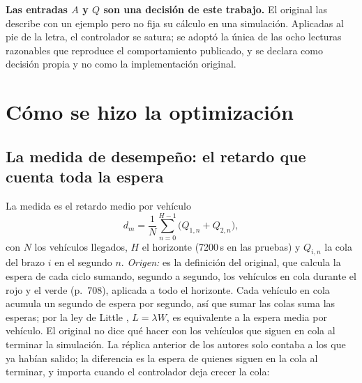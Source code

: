 \documentclass[11pt,a4paper]{article}
\begin{document}
\textbf{Las entradas $A$ y $Q$ son una decisión de este trabajo.} El original las describe con un ejemplo pero no fija su cálculo en una simulación. Aplicadas al pie de la letra, el controlador se satura; se adoptó la única de las ocho lecturas razonables que reproduce el comportamiento publicado, y se declara como decisión propia y no como la implementación original.

\section{Cómo se hizo la optimización}
\label{sec:como}

\subsection{La medida de desempeño: el retardo que cuenta toda la espera}
\label{sec:medida}
La medida es el retardo medio por vehículo
\begin{equation}
d_m=\frac{1}{N}\sum_{n=0}^{H-1}\bigl(Q_{1,n}+Q_{2,n}\bigr),
\label{eq:dm}
\end{equation}
con $N$ los vehículos llegados, $H$ el horizonte (7200\,s en las pruebas) y $Q_{i,n}$ la cola del brazo $i$ en el segundo $n$. \emph{Origen:} es la definición del original, que calcula la espera de cada ciclo sumando, segundo a segundo, los vehículos en cola durante el rojo y el verde (p.~708), aplicada a todo el horizonte. Cada vehículo en cola acumula un segundo de espera por segundo, así que sumar las colas suma las esperas; por la ley de Little \cite{Little1961}, $L=\lambda W$, es equivalente a la espera media por vehículo. El original no dice qué hacer con los vehículos que siguen en cola al terminar la simulación. La réplica anterior de los autores solo contaba a los que ya habían salido; la diferencia es la espera de quienes siguen en la cola al terminar, y importa cuando el controlador deja crecer la cola:
\end{document}
